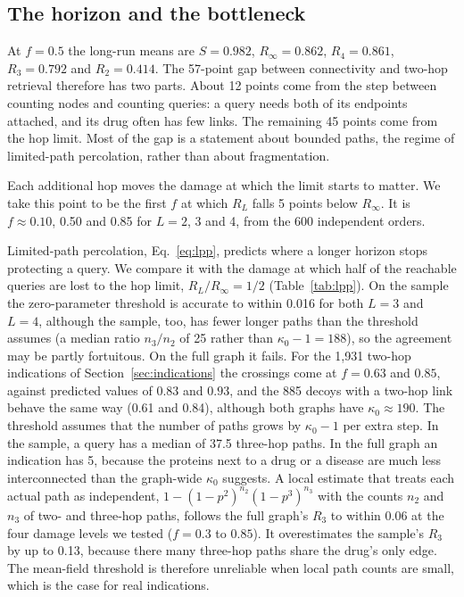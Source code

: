 \subsection{The horizon and the bottleneck}
\label{sec:blind-horizon}

At $f=0.5$ the long-run means are $S=0.982$, $R_\infty=0.862$, $R_4=0.861$,
$R_3=0.792$ and $R_2=0.414$. The 57-point gap between connectivity and two-hop
retrieval therefore has two parts. About 12 points come from the step between
counting nodes and counting queries: a query needs both of its endpoints
attached, and its drug often has few links. The remaining 45 points come from
the hop limit. Most of the gap is a statement about bounded paths, the regime of
limited-path percolation, rather than about fragmentation.

Each additional hop moves the damage at which the limit starts to matter. We
take this point to be the first $f$ at which $R_L$ falls 5 points below
$R_\infty$. It is $f\approx0.10$, 0.50 and 0.85 for $L=2$, 3 and 4, from the 600
independent orders.

Limited-path percolation, Eq.~\eqref{eq:lpp}, predicts where a longer horizon
stops protecting a query. We compare it with the damage at which half of the
reachable queries are lost to the hop limit, $R_L/R_\infty=1/2$
(Table~\ref{tab:lpp}). On the sample the zero-parameter threshold is accurate
to within 0.016 for both $L=3$ and $L=4$, although the sample, too, has fewer
longer paths than the threshold assumes (a median ratio $n_3/n_2$ of 25 rather
than $\kappa_0-1=188$), so the agreement may be partly fortuitous. On the full
graph it fails. For the
1,931 two-hop indications of Section~\ref{sec:indications} the crossings come
at $f=0.63$ and $0.85$, against predicted values of $0.83$ and $0.93$, and the
885 decoys with a two-hop link behave the same way (0.61 and 0.84), although both
graphs have $\kappa_0\approx190$. The threshold assumes that the number of
paths grows by $\kappa_0-1$ per extra step. In the sample, a query has a median
of 37.5 three-hop paths. In the full graph an indication has 5, because the
proteins next to a drug or a disease are much less interconnected than the
graph-wide $\kappa_0$ suggests. A local estimate that treats each actual path as
independent, $1-(1-p^2)^{n_2}(1-p^3)^{n_3}$ with the counts $n_2$ and $n_3$ of
two- and three-hop paths, follows the full graph's $R_3$ to within 0.06 at the four
damage levels we tested ($f=0.3$ to $0.85$). It overestimates the sample's $R_3$ by up to 0.13, because there
many three-hop paths share the drug's only edge. The mean-field threshold
is therefore unreliable when local path counts are small, which is the case for
real indications.

